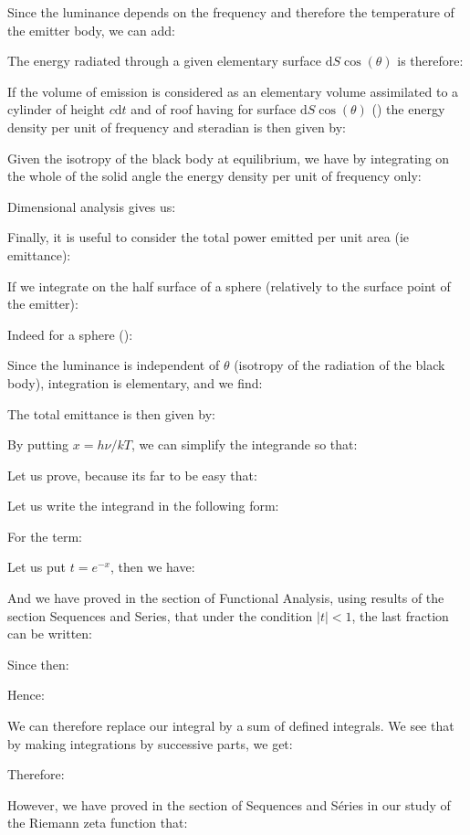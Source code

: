 	Since the luminance depends on the frequency and therefore the temperature of the emitter body, we can add:
	
	The energy radiated through a given elementary surface $\mathrm{d}S\cos(\theta)$ is therefore:
	
	If the volume of emission is considered as an elementary volume assimilated to a cylinder of height $c\mathrm{d}t$ and of roof having for surface $\mathrm{d}S\cos(\theta)$ () the energy density per unit of frequency and steradian is then given by:
	
	Given the isotropy of the black body at equilibrium, we have by integrating on the whole of the solid angle the energy density per unit of frequency only:
	
	Dimensional analysis gives us:
	
	Finally, it is useful to consider the total power emitted per unit area (ie emittance):
	
	If we integrate on the half surface of a sphere (relatively to the surface point of the emitter):
	
	Indeed for a sphere ():
	
	Since the luminance is independent of $\theta$ (isotropy of the radiation of the black body), integration is elementary, and we find:
	
	The total emittance is then given by:
	
	By putting $x=h\nu/kT$, we can simplify the integrande so that:
	
	Let us prove, because its far to be easy that:
	
	Let us write the integrand in the following form:
	
	For the term:
	
	Let us put $t=e^{-x}$, then we have:
	
	And we have proved in the section of Functional Analysis, using results of the section Sequences and Series, that under the condition $|t|<1$, the last fraction can be written:
	
	Since then:
	
	Hence:
	
	We can therefore replace our integral by a sum of defined integrals. We see that by making integrations by successive parts, we get:
	
	Therefore:
	
	However, we have proved in the section of Sequences and Séries in our study of the Riemann zeta function that:
	
